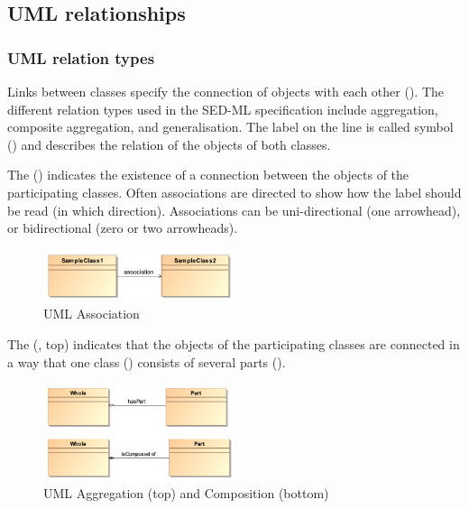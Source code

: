 \subsection{UML relationships}
\subsubsection{UML relation types}
Links between classes specify the connection of objects with each other (). The different relation types used in the SED-ML specification include aggregation, composite aggregation, and generalisation. The label on the line is called symbol () and describes the relation of the objects of both classes. 

The  () indicates the existence of a connection between the objects of the participating classes. Often associations are directed to show how the label should be read (in which direction). Associations can be uni-directional (one arrowhead), or bidirectional (zero or two arrowheads).
  
\begin{figure}[h]
	\centering
	\includegraphics[width=0.5\textwidth]{images/pdf/umlAssociation}
	\caption{UML Association}
	\label{fig:umlAssociation}
\end{figure}


The  (, top) indicates that the objects of the participating classes are connected in a way that one class () consists of several parts ().

\begin{figure}[h]
	\centering
	\includegraphics[width=0.5\textwidth]{images/pdf/umlAggregation}
	\caption{UML Aggregation (top) and Composition (bottom)}
	\label{fig:umlAggregation}
\end{figure}


